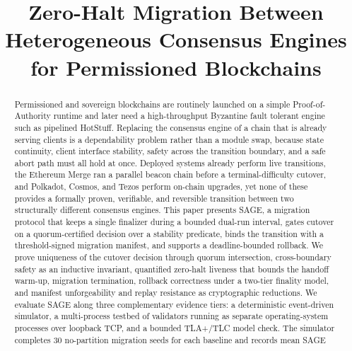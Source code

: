 \documentclass[journal]{IEEEtran}
\theoremstyle{remark}
\begin{document}
\title{Zero-Halt Migration Between Heterogeneous Consensus Engines for Permissioned Blockchains}



\maketitle

\begin{abstract}
Permissioned and sovereign blockchains are routinely launched on a simple
Proof-of-Authority runtime and later need a high-throughput Byzantine fault tolerant
engine such as pipelined HotStuff. Replacing the consensus engine of a chain that is
already serving clients is a dependability problem rather than a module swap, because
state continuity, client interface stability, safety across the transition boundary, and
a safe abort path must all hold at once. Deployed systems already perform live
transitions, the Ethereum Merge ran a parallel beacon chain before a terminal-difficulty
cutover, and Polkadot, Cosmos, and Tezos perform on-chain upgrades, yet none of these
provides a formally proven, verifiable, and reversible transition between two structurally
different consensus engines. This paper presents SAGE, a migration protocol that keeps a
single finalizer during a bounded dual-run interval, gates cutover on a quorum-certified
decision over a stability predicate, binds the transition with a threshold-signed
migration manifest, and supports a deadline-bounded rollback. We prove uniqueness of the
cutover decision through quorum intersection, cross-boundary safety as an inductive
invariant, quantified zero-halt liveness that bounds the handoff warm-up, migration
termination, rollback correctness under a two-tier finality model, and manifest
unforgeability and replay resistance as cryptographic reductions. We evaluate SAGE along three complementary evidence tiers: a deterministic event-driven
simulator, a multi-process testbed of validators running as separate operating-system
processes over loopback TCP, and a bounded TLA+/TLC model check. The simulator
completes 30 no-partition migration seeds for each baseline and records mean SAGE

\end{abstract}
\end{document}
